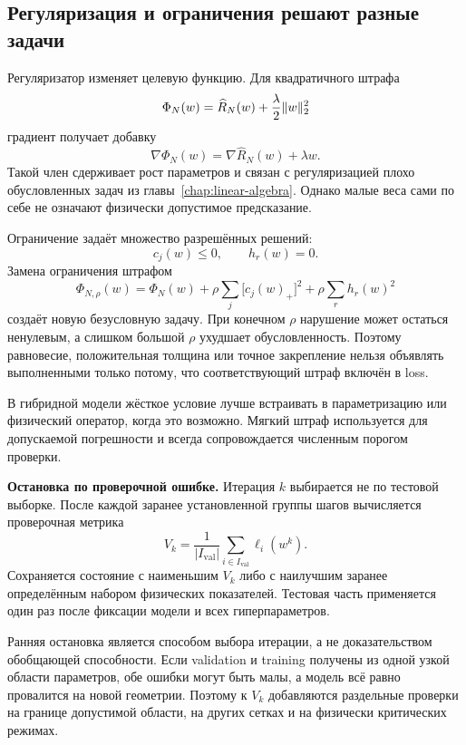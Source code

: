 \subsection{Регуляризация и ограничения решают разные задачи}
Регуляризатор изменяет целевую функцию. Для квадратичного штрафа
\begin{equation}
 \Phi_N(w)
 =
 \widehat R_N(w)
 +\frac{\lambda}{2}\lVert w\rVert_2^2
\end{equation}
градиент получает добавку
\begin{equation}
 \nabla\Phi_N(w)
 =
 \nabla\widehat R_N(w)+\lambda w.
\end{equation}
Такой член сдерживает рост параметров и связан с регуляризацией плохо обусловленных задач из главы~\ref{chap:linear-algebra}. Однако малые веса сами по себе не означают физически допустимое предсказание.

Ограничение задаёт множество разрешённых решений:
\begin{equation}
 c_j(w)\leq0,
 \qquad
 h_r(w)=0.
\end{equation}
Замена ограничения штрафом
\begin{equation}
 \Phi_{N,\rho}(w)
 =
 \Phi_N(w)
 +\rho\sum_j\bigl[c_j(w)_+\bigr]^2
 +\rho\sum_r h_r(w)^2
\end{equation}
создаёт новую безусловную задачу. При конечном $\rho$ нарушение может остаться ненулевым, а слишком большой $\rho$ ухудшает обусловленность. Поэтому равновесие, положительная толщина или точное закрепление нельзя объявлять выполненными только потому, что соответствующий штраф включён в loss.

В гибридной модели жёсткое условие лучше встраивать в параметризацию или физический оператор, когда это возможно. Мягкий штраф используется для допускаемой погрешности и всегда сопровождается численным порогом проверки.

\medskip
\noindent\textbf{Остановка по проверочной ошибке.}
Итерация $k$ выбирается не по тестовой выборке. После каждой заранее установленной группы шагов вычисляется проверочная метрика
\begin{equation}
 V_k
 =
 \frac1{|I_{\mathrm{val}}|}
 \sum_{i\in I_{\mathrm{val}}}
 \ell_i(w^k).
\end{equation}
Сохраняется состояние с наименьшим $V_k$ либо с наилучшим заранее определённым набором физических показателей. Тестовая часть применяется один раз после фиксации модели и всех гиперпараметров.

Ранняя остановка является способом выбора итерации, а не доказательством обобщающей способности. Если validation и training получены из одной узкой области параметров, обе ошибки могут быть малы, а модель всё равно провалится на новой геометрии. Поэтому к $V_k$ добавляются раздельные проверки на границе допустимой области, на других сетках и на физически критических режимах.

